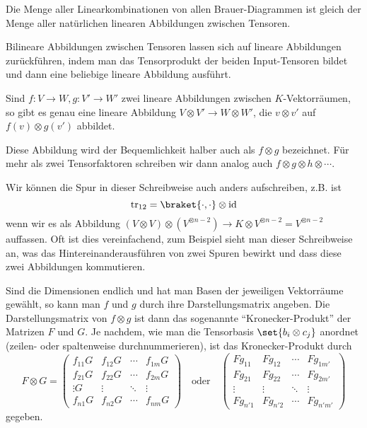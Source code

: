 \begin{remark}
	Die Menge aller Linearkombinationen von allen Brauer-Diagrammen ist gleich der Menge aller natürlichen linearen Abbildungen zwischen Tensoren.
\end{remark}
\begin{remark}
	Bilineare Abbildungen zwischen Tensoren lassen sich auf lineare Abbildungen zurückführen, indem man das Tensorprodukt der beiden Input-Tensoren bildet und dann eine beliebige lineare Abbildung ausführt.
\end{remark}
	
\begin{lemmadef}
Sind $f:V\to W, g: V'\to W'$ zwei lineare Abbildungen zwischen $K$-Vektorräumen, so gibt es genau eine lineare Abbildung $V\otimes V'  \to W\otimes W'$, die $v\otimes v'$ auf $f(v)\otimes g(v')$ abbildet.

Diese Abbildung wird der Bequemlichkeit halber auch als $f\otimes g$ bezeichnet. Für mehr als zwei Tensorfaktoren schreiben wir dann analog auch $f\otimes g\otimes h\otimes\cdots$. 
\end{lemmadef}

\begin{example}
Wir können die Spur in dieser Schreibweise auch anders aufschreiben, z.B. ist
\[\tr_{12} = \braket{\cdot,\cdot} \otimes \id\]
wenn wir es als Abbildung $(V\otimes V)\otimes(V^{\otimes n-2}) \to K \otimes V^{\otimes n-2} = V^{\otimes n-2}$ auffassen. Oft ist dies vereinfachend, zum Beispiel sieht man dieser Schreibweise an, was das Hintereinanderausführen von zwei Spuren bewirkt und dass diese zwei Abbildungen kommutieren.
\end{example}

\begin{remark}
Sind die Dimensionen endlich und hat man Basen der jeweiligen Vektorräume gewählt, so kann man $f$ und $g$ durch ihre Darstellungsmatrix angeben. Die Darstellungsmatrix von $f\otimes g$ ist dann das sogenannte \enquote{Kronecker-Produkt} der Matrizen $F$ und $G$. Je nachdem, wie man die Tensorbasis $\set{b_i\otimes c_j}$ anordnet (zeilen- oder spaltenweise durchnummerieren), ist das Kronecker-Produkt durch
\[F\otimes G = \begin{pmatrix}
f_{11} G & f_{12} G & \cdots & f_{1m} G \\
f_{21} G & f_{22} G & \cdots & f_{2m} G \\
\vdots G &  \vdots  & \ddots & \vdots   \\
f_{n1} G & f_{n2} G & \cdots & f_{nm} G
\end{pmatrix} \quad\text{oder}\quad \begin{pmatrix}
F g_{11} & F g_{12} & \cdots & F g_{1m'} \\
F g_{21} & F g_{22} & \cdots & F g_{2m'} \\
  \vdots &   \vdots & \ddots &   \vdots  \\
F g_{n'1} & F g_{n'2} & \cdots & F g_{n'm'}
\end{pmatrix}\]
gegeben.
\end{remark}


